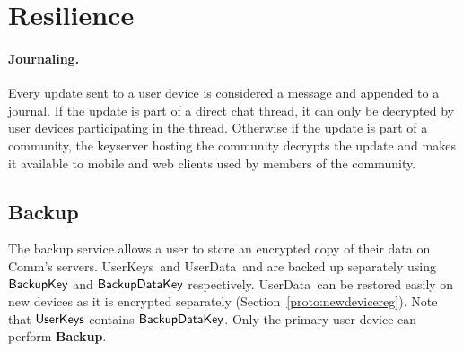 \documentclass{article}
\newcommand{\bk}{{\sf BackupKey}}
\newcommand{\bkdata}{{\sf BackupDataKey}}
\newcommand{\userdata}{{\sf UserData}}
\newcommand{\userkeys}{{\sf UserKeys}}
\newcommand{\aktodo}[1]{\dtcolornote[Anunay]{blue}{#1}}
\begin{document}








\section{Resilience}



\paragraph{Journaling.} Every update sent to a user device is considered a message and appended to a journal. If the update is part of a direct chat thread, it can only be decrypted by user devices participating in the thread. Otherwise if the update is part of a community, the keyserver hosting the community decrypts the update and makes it available to mobile and web clients used by members of the community.

\subsection{Backup}
\label{sec:backup}

The backup service allows a user to store an encrypted copy of their data on Comm's servers. \userkeys~and \userdata~and are backed up separately using $\bk$ and $\bkdata$ respectively. \userdata~can be restored easily on new devices as it is encrypted separately (Section~\ref{proto:newdevicereg}). Note that $\userkeys$ contains $\bkdata$. Only the primary user device can perform {\bf Backup}. 
\end{document}
